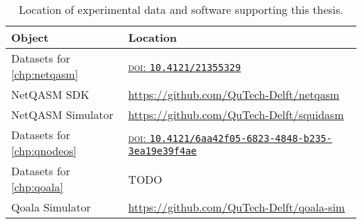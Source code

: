 \begin{table}[t]
    \centering
    \begin{tabularx}{\linewidth}{lX}
        \toprule
        \textbf{Object}                   & \textbf{Location}                                                                 \\
        \midrule
        Datasets for \cref{chp:netqasm}   & \href{https://doi.org/10.4121/21355329}{\textsc{doi}: \texttt{10.4121/21355329}}  \\
        NetQASM SDK                       & \url{https://github.com/QuTech-Delft/netqasm}                                     \\
        NetQASM Simulator                 & \url{https://github.com/QuTech-Delft/squidasm}                                    \\
        Datasets for \cref{chp:qnodeos}   & \href{https://doi.org/10.4121/6aa42f05-6823-4848-b235-3ea19e39f4ae}{\textsc{doi}: \texttt{10.4121/6aa42f05-6823-4848-b235-3ea19e39f4ae}} \\
        Datasets for \cref{chp:qoala}     & TODO                                                                              \\
        Qoala Simulator                   & \url{https://github.com/QuTech-Delft/qoala-sim}                                   \\
        \bottomrule
    \end{tabularx}
    \caption{
        Location of experimental data and software supporting this thesis.
    }
    \label{tab:data-and-soft}
\end{table}


\begin{xstretch}
\printbibliography[heading=subbibintoc,title={References},notcategory=noprint]
\end{xstretch}
